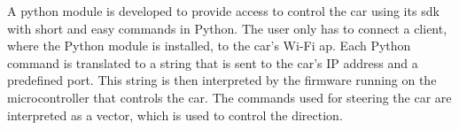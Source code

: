 A python module is developed to provide access to control the car using its \ac{sdk} with short and easy commands in Python. The user only has to connect a client, where the Python module is installed, to the car's Wi-Fi \ac{ap}. Each Python command is translated to a string that is sent to the car's IP address and a predefined port. This string is then interpreted by the firmware running on the microcontroller that controls the car. The commands used for steering the car are interpreted as a vector, which is used to control the direction.\\